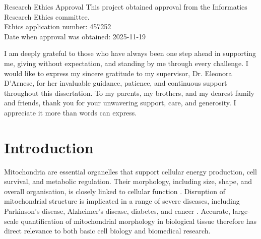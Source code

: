\documentclass[logo,bsc,singlespacing,parskip,online]{infthesis}
\begin{document}
\begin{preliminary}
\maketitle

\newenvironment{ethics}
   {\begin{frontenv}{Research Ethics Approval}{\LARGE}}
   {\end{frontenv}\newpage}

\begin{ethics}
This project obtained approval from the Informatics Research Ethics committee.\\
Ethics application number: 457252\\
Date when approval was obtained: 2025-11-19

\standarddeclaration
\end{ethics}


\begin{acknowledgements}
I am deeply grateful to those who have always been one step ahead in supporting me, 
giving without expectation, and standing by me through every challenge. I would like 
to express my sincere gratitude to my supervisor, Dr. Eleonora D’Arnese, for her 
invaluable guidance, patience, and continuous support throughout this dissertation. 
To my parents, my brothers, and my dearest family and friends, thank you for your 
unwavering support, care, and generosity. I appreciate it more than words can express.
\end{acknowledgements}


\tableofcontents
\end{preliminary}


\chapter{Introduction}

Mitochondria are essential organelles that support cellular energy production,
cell survival, and metabolic regulation. Their morphology, including
size, shape, and overall organisation, is closely linked to cellular function
\citep{SuomalainenNunnari2024Cell}.
Disruption of mitochondrial structure is implicated in a range of severe
diseases, including Parkinson's disease, Alzheimer's disease, diabetes, and
cancer \citep{SuomalainenNunnari2024Cell, tilokani2018mitochondrial}. Accurate,
large-scale quantification of mitochondrial morphology in biological tissue
therefore has direct relevance to both basic cell biology and biomedical
research.
\end{document}
